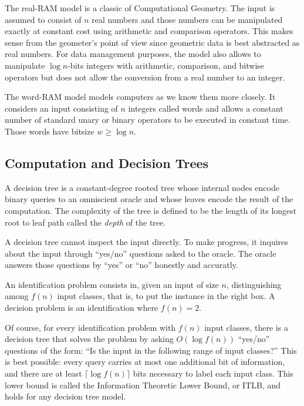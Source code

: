 The real-RAM model is a classic of Computational Geometry. The input is assumed
to consist of \(n\) real numbers and those numbers can be manipulated
exactly at constant cost using arithmetic and comparison operators.
This makes sense from the geometer's point of view since geometric data is
best abstracted as real numbers.
For data management purposes, the model also allows to manipulate \(\log
n\)-bits integers with arithmetic, comparison, and bitwise operators but does
not allow the conversion from a real number to an integer.

The word-RAM model models computers as we know them more closely. It considers
an input consisting of \(n\) integers called words and allows a constant number
of standard unary or binary operators to be executed in constant time. Those
words have bitsize \(w \geq \log n\).

\subsection{Computation and Decision Trees}%
\label{sec:models-of-computation:algorithms:trees}

A decision tree is a constant-degree rooted tree whose internal nodes encode
binary queries to an omniscient oracle and whose leaves encode the result of the
computation. The complexity of the tree is defined to be the length of
its longest root to leaf path called the \emph{depth} of the tree.

A decision tree cannot inspect the input directly.
To make progress, it inquires about the input through ``yes/no'' questions
asked to the oracle. The oracle answers those questions by ``yes'' or ``no''
honestly and accuratly.

An identification problem consists in, given an input of size \(n\),
distinguishing among \(f(n)\) input classes, that is, to put the instance in
the right box. A decision problem is an identification where \(f(n) = 2\).

Of course, for every identification problem with \(f(n)\) input classes,
there is a decision tree that solves the problem by asking
\(O(\log f(n))\) ``yes/no'' questions of the form:
``Is the input in the following range of input classes?''
%
This is best possible: every query carries at most one additional bit of
information, and there are at least \(\lceil \log f(n) \rceil\) bits necessary
to label each input class. This lower bound is called the Information Theoretic
Lower Bound, or ITLB, and holds for any decision tree model.

